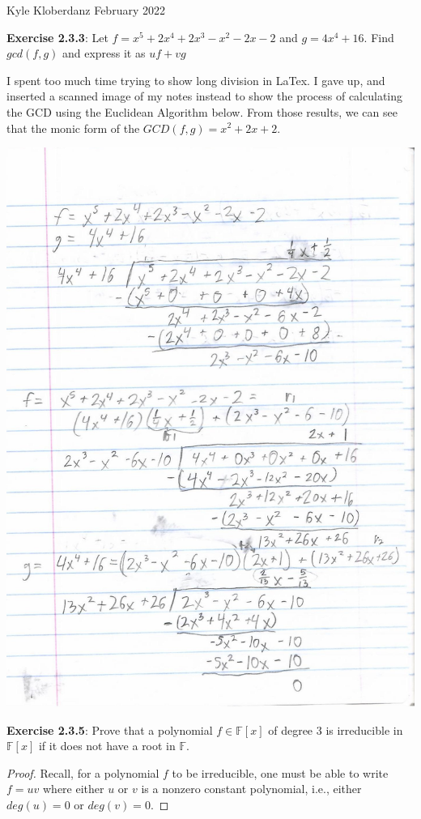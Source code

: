 \documentclass[a4paper]{article}
\begin{document}
\begin{myparindent}{0pt}

Kyle Kloberdanz  February 2022 \newline

\textbf{Exercise 2.3.3}:
Let $f = x^5 + 2x^4 + 2x^3 - x^2 - 2x - 2$ and $g = 4x^4 + 16$. Find $gcd(f, g)$
and express it as $uf + vg$
\newline

I spent too much time trying to show long division in LaTex. I gave up, and
inserted a scanned image of my notes instead to show the process of calculating
the GCD using the Euclidean Algorithm below. From those results, we can see that
the monic form of the $GCD(f, g) = x^2 + 2x + 2$.

\includegraphics{longdivision}

\textbf{Exercise 2.3.5}:
Prove that a polynomial $f \in \mathbb{F}[x]$ of degree 3 is irreducible in
$\mathbb{F}[x]$ if it does not have a root in $\mathbb{F}$.
\newline
\begin{proof}
  Recall, for a polynomial $f$ to be irreducible, one must be able to write
  $f = uv$ where either $u$ or $v$ is a nonzero constant polynomial, i.e.,
  either $deg(u) = 0$ or $deg(v) = 0$. \newline


\end{proof}
\end{myparindent}
\end{document}
